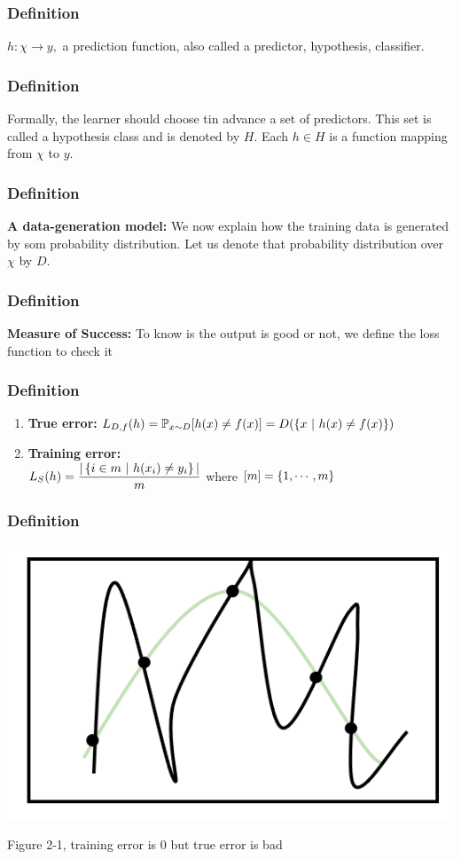 \begin{frame}
	\frametitle{Definition}
	$h:\chi \rightarrow y,$ a prediction function, also called a predictor, hypothesis, classifier.
\end{frame}


\begin{frame}
	\frametitle{Definition}
	Formally, the learner should choose tin advance a set of predictors. This set is called a hypothesis class and is denoted by $H$. Each $h \in H$ is a function mapping from $\chi$ to $y$.
\end{frame}


\begin{frame}
	\frametitle{Definition}
	\textbf{A data-generation model:} We now explain how the training data is generated by som probability distribution. Let us denote that probability distribution over $\chi$ by $D$.
	
\end{frame}

\begin{frame}
	\frametitle{Definition}
	\textbf{Measure of Success:} To know is the output is good or not, we define the loss function to check it
	
\end{frame}

\begin{frame}
	\frametitle{Definition}
	\begin{enumerate}
		\item \textbf{True error:} $L_{D,f}(h) = \mathbb{P}_{x\sim D}[h(x) \neq f(x)] = D(\left\{x ~|~ h(x) \neq f(x) \right\})$
		\item \textbf{Training error:} \\ $L_S(h) = \dfrac{|\left\{i \in m ~|~ h(x_i) \neq y_i \right\} |}{m}$ where $[m] = \left\{1,\cdots,m \right\}$
	\end{enumerate}
	
\end{frame}

\begin{frame}
	\frametitle{Definition}
	\begin{center}
		\includegraphics[scale = 0.3]{./figure/2-1.png}
		
		Figure 2-1, training error is $0$ but true error is bad
	\end{center}
	
\end{frame}


